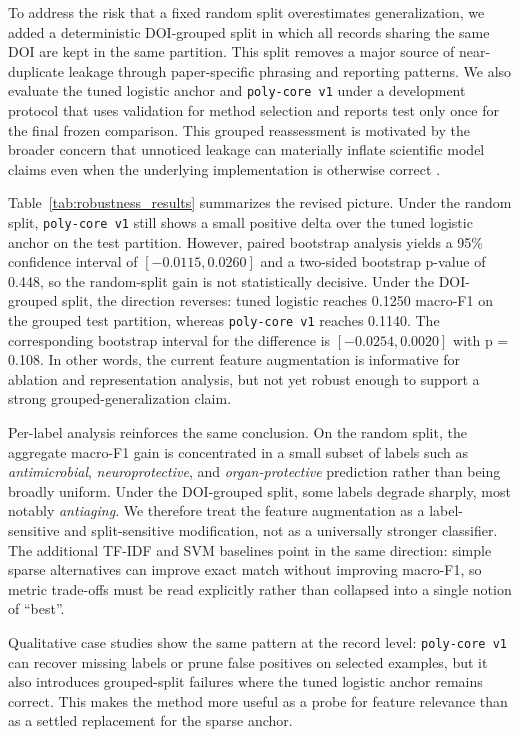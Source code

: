 \documentclass{article}
\begin{document}
To address the risk that a fixed random split overestimates generalization, we added a deterministic DOI-grouped split in which all records sharing the same DOI are kept in the same partition. This split removes a major source of near-duplicate leakage through paper-specific phrasing and reporting patterns. We also evaluate the tuned logistic anchor and \texttt{poly-core v1} under a development protocol that uses validation for method selection and reports test only once for the final frozen comparison. This grouped reassessment is motivated by the broader concern that unnoticed leakage can materially inflate scientific model claims even when the underlying implementation is otherwise correct \cite{kapoor2023leakage}.

Table~\ref{tab:robustness_results} summarizes the revised picture. Under the random split, \texttt{poly-core v1} still shows a small positive delta over the tuned logistic anchor on the test partition. However, paired bootstrap analysis yields a 95\% confidence interval of \([-0.0115, 0.0260]\) and a two-sided bootstrap p-value of 0.448, so the random-split gain is not statistically decisive. Under the DOI-grouped split, the direction reverses: tuned logistic reaches 0.1250 macro-F1 on the grouped test partition, whereas \texttt{poly-core v1} reaches 0.1140. The corresponding bootstrap interval for the difference is \([-0.0254, 0.0020]\) with p = 0.108. In other words, the current feature augmentation is informative for ablation and representation analysis, but not yet robust enough to support a strong grouped-generalization claim.

Per-label analysis reinforces the same conclusion. On the random split, the aggregate macro-F1 gain is concentrated in a small subset of labels such as \textit{antimicrobial}, \textit{neuroprotective}, and \textit{organ-protective} prediction rather than being broadly uniform. Under the DOI-grouped split, some labels degrade sharply, most notably \textit{antiaging}. We therefore treat the feature augmentation as a label-sensitive and split-sensitive modification, not as a universally stronger classifier. The additional TF-IDF and SVM baselines point in the same direction: simple sparse alternatives can improve exact match without improving macro-F1, so metric trade-offs must be read explicitly rather than collapsed into a single notion of ``best''.

Qualitative case studies show the same pattern at the record level: \texttt{poly-core v1} can recover missing labels or prune false positives on selected examples, but it also introduces grouped-split failures where the tuned logistic anchor remains correct. This makes the method more useful as a probe for feature relevance than as a settled replacement for the sparse anchor.
\end{document}
